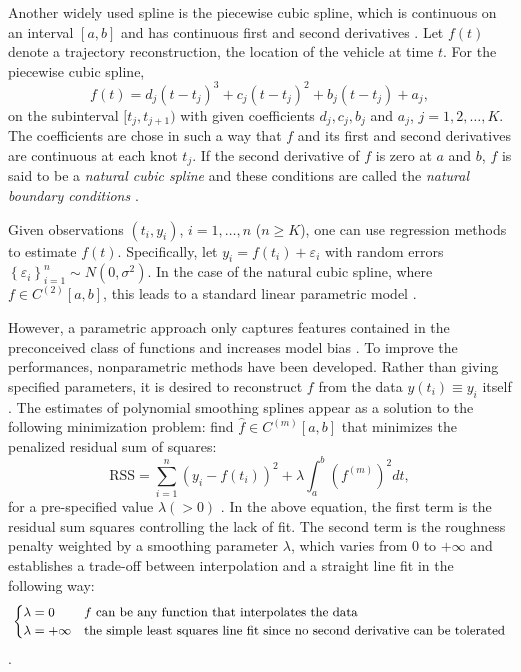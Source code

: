 Another widely used spline is the piecewise cubic spline, which is continuous on an interval $[a,b]$ and has continuous first and second derivatives \citep{wolberg1988cubic}. Let $f(t)$ denote a trajectory reconstruction, \ie the location of the vehicle at time $t$. For the piecewise cubic spline,  
\begin{equation}
f(t)=d_j(t-t_j)^3+c_j(t-t_j)^2+b_j(t-t_j)+a_j,
\end{equation}
on the subinterval $[t_j,t_{j+1})$ with given coefficients $d_j, c_j, b_j$ and $a_j$, $j=1,2,\ldots,K$. The coefficients are chose in such a way that $f$ and its first and second derivatives are continuous at each knot $t_j$. If the second derivative of $f$ is zero at $a$ and $b$, $f$ is said to be a \textit{natural cubic spline} and these conditions are called the \textit{natural boundary conditions}  \citep{green1993nonparametric}. 


Given observations $\left(t_i,y_i\right)$, $i=1,\ldots,n$ ($n\geq K$), one can use regression methods to estimate $f(t)$. Specifically, let $y_i=f(t_i)+\varepsilon_i$ with random errors $\left\lbrace \varepsilon_i\right\rbrace_{i=1}^n \sim N\left(0,\sigma^2\right)$. In the case of the natural cubic spline, where $f\in \mathit{C}^{(2)}[a,b]$, this leads to a standard linear parametric model \citep{kim2004smoothing}. 


However, a parametric approach only captures features contained in the preconceived class of functions and increases model bias \citep{yao2005functional}. To improve the performances, nonparametric methods have been developed. Rather than giving specified parameters, it is desired to reconstruct $f$ from the data $y(t_i)\equiv y_i$ itself  \citep{craven1978smoothing}. The estimates of polynomial smoothing splines appear as a solution to the following minimization problem: find $\hat{f} \in \mathit{C}^{(m)}[a,b]$ that minimizes the penalized residual sum of squares: 
\begin{equation}\label{introSmoothingOb}
\mbox{RSS}=\sum_{i=1}^{n}\left(y_i-f(t_i)\right)^2+\lambda\int_a^b \left(f^{(m)}\right)^2dt, 
\end{equation}
for a pre-specified value $\lambda(>0)$ \citep{aydin2012smoothing}. In the above equation, the first term is the residual sum squares controlling the lack of fit. The second term is the roughness penalty weighted by a smoothing parameter $\lambda$, which varies from $0$ to $+\infty$ and establishes a trade-off between interpolation and a  straight line fit in the following way: 
\begin{align*}\small 
\begin{cases}
\lambda = 0  & \mbox{$f$ can be any function that interpolates the data}\\
\lambda = +\infty & \mbox{the simple least squares line fit since no second derivative can be tolerated}
\end{cases}
\end{align*}\citep{esl2009}. 

